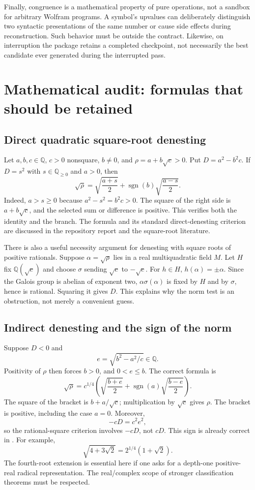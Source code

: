 \documentclass[11pt,a4paper]{article}
\newcommand{\code}[1]{\texttt{\detokenize{#1}}}
\newcommand{\Q}{\mathbb Q}\newcommand{\R}{\mathbb R}\newcommand{\C}{\mathbb C}
\newcommand{\sgn}{\operatorname{sgn}}
\theoremstyle{remark}\newtheorem{remark}[theorem]{Remark}
\begin{document}
Finally, congruence is a mathematical property of pure operations, not a sandbox for arbitrary Wolfram programs. A symbol's upvalues can deliberately distinguish two syntactic presentations of the same number or cause side effects during reconstruction. Such behavior must be outside the contract. Likewise, on interruption the package retains a completed checkpoint, not necessarily the best candidate ever generated during the interrupted pass.

\section{Mathematical audit: formulas that should be retained}
\subsection{Direct quadratic square-root denesting}
Let $a,b,c\in\Q$, $c>0$ nonsquare, $b\ne0$, and $\rho=a+b\sqrt c>0$. Put $D=a^2-b^2c$. If $D=s^2$ with $s\in\Q_{\ge0}$ and $a>0$, then
\begin{equation}\label{eq:direct}
 \sqrt\rho=\sqrt{\frac{a+s}{2}}+\sgn(b)\sqrt{\frac{a-s}{2}}.
\end{equation}
Indeed, $a>s\ge0$ because $a^2-s^2=b^2c>0$. The square of the right side is $a+b\sqrt c$, and the selected sum or difference is positive. This verifies both the identity and the branch. The formula and its standard direct-denesting criterion are discussed in the repository report and the square-root literature.\cite{report,gkioulekas}

There is also a useful necessity argument for denesting with square roots of positive rationals. Suppose $\alpha=\sqrt\rho$ lies in a real multiquadratic field $M$. Let $H$ fix $\Q(\sqrt c)$ and choose $\sigma$ sending $\sqrt c$ to $-\sqrt c$. For $h\in H$, $h(\alpha)=\pm\alpha$. Since the Galois group is abelian of exponent two, $\alpha\sigma(\alpha)$ is fixed by $H$ and by $\sigma$, hence is rational. Squaring it gives $D$. This explains why the norm test is an obstruction, not merely a convenient guess.

\subsection{Indirect denesting and the sign of the norm}
Suppose $D<0$ and
\[
 e=\sqrt{b^2-a^2/c}\in\Q.
\]
Positivity of $\rho$ then forces $b>0$, and $0<e\le b$. The correct formula is
\begin{equation}\label{eq:indirect}
 \sqrt\rho=c^{1/4}\left(\sqrt{\frac{b+e}{2}}+
 \sgn(a)\sqrt{\frac{b-e}{2}}\right).
\end{equation}
The square of the bracket is $b+a/\sqrt c$; multiplication by $\sqrt c$ gives $\rho$. The bracket is positive, including the case $a=0$. Moreover,
\[
 -cD=c^2e^2,
\]
so the rational-square criterion involves \emph{$-cD$}, not $cD$. This sign is already correct in \code{StradFixed2}. For example,
\[
 \sqrt{4+3\sqrt2}=2^{1/4}(1+\sqrt2).
\]
The fourth-root extension is essential here if one asks for a depth-one positive-real radical representation. The real/complex scope of stronger classification theorems must be respected.\cite{report,bfht,gkioulekas}
\end{document}
